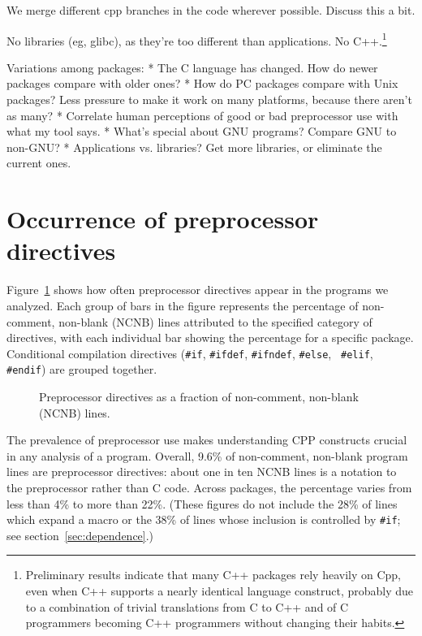 \documentclass[10pt]{article}
\newcommand{\pkg}[1]{\textsf{#1}}
\begin{document}
We  merge different cpp branches in the code wherever possible.  Discuss
this a bit.


No libraries (eg, \pkg{glibc}), as they're too different than applications.
No C++.\footnote{Preliminary results indicate that many
  C++ packages rely heavily on Cpp, even when C++ supports a nearly
  identical language construct, probably due to a combination of trivial
  translations from C to C++ and of C programmers becoming C++ programmers
  without changing their habits.}

Variations among packages:
 * The C language has changed.  How do newer packages compare with older ones?
 * How do PC packages compare with Unix packages?  Less pressure to make it
   work on many platforms, because there aren't as many?
 * Correlate human perceptions of good or bad preprocessor use with what my
   tool says.
 * What's special about GNU programs?  Compare GNU to non-GNU?
 * Applications vs. libraries?  Get more libraries, or eliminate the current
   ones.


\section{Occurrence of preprocessor directives}
\label{sec:directives}

Figure~\ref{fig:directives-breakdown} shows how often preprocessor
directives appear in the programs we analyzed.  Each group of bars in the
figure represents the percentage of non-comment, non-blank (NCNB) lines
attributed to the specified category of directives, with each individual
bar showing the percentage for a specific package.  Conditional compilation
directives ({\tt \#if}, {\tt \#ifdef}, {\tt \#ifndef}, {\tt \#else}, {\tt
\#elif}, {\tt \#endif}) are grouped together.

\begin{figure}
\centerline{}
\caption{Preprocessor directives as a fraction of non-comment,
  non-blank (NCNB) lines.}
\label{fig:directives-breakdown}
\end{figure}

The prevalence of preprocessor use makes understanding CPP constructs
crucial in any analysis of a program.  Overall, 9.6\% of non-comment,
non-blank program lines are preprocessor directives: about one in ten NCNB
lines is a notation to the preprocessor rather than C code.  Across
packages, the percentage varies from less than 4\% to more than 22\%.
(These figures do not include the 28\% of lines which expand a macro or the
38\% of lines whose inclusion is controlled by {\tt \#if}; see
section~\ref{sec:dependence}.)
\end{document}
